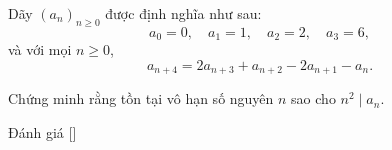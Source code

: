 \ifshowproblem
\begin{problem}\label{problem:BMO-2015-P2}
    Dãy \( (a_n)_{n \geq 0} \) được định nghĩa như sau:
    \[
        a_0 = 0,\quad a_1 = 1,\quad a_2 = 2,\quad a_3 = 6,
    \]
    và với mọi \( n \geq 0 \),
    \[
        a_{n+4} = 2a_{n+3} + a_{n+2} - 2a_{n+1} - a_n.
    \]
    
    Chứng minh rằng tồn tại vô hạn số nguyên \( n \) sao cho \( n^2 \mid a_n \).
\end{problem}
\fi

\ifshowinfo
Đánh giá [\textbf{}]\footnotemark
{}
\fi